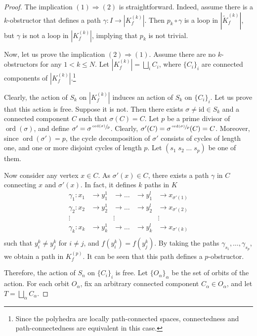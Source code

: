 \documentclass[a4paper,12pt,reqno,oneside]{amsart}
\theoremstyle{plain}
\theoremstyle{definition}
\theoremstyle{plain}
\newcommand{\from}{\colon}
\newcommand{\wt}[1]{\widetilde{#1}}
\newcommand{\id}{\mathrm{id}}
\DeclareMathOperator{\ord}{ord}
\begin{document}
\begin{proof}
  The implication $(1) \Rightarrow (2)$ is straightforward. Indeed, assume there is a
  $k$-obstructor that defines a path $\gamma \from I \to |K^{(k)}_f|$. Then $p_k \circ \gamma$ is a
  loop in $|\wt{K}^{(k)}_f|$, but $\gamma$ is not a loop in $|K^{(k)}_f|$, implying that $p_k$ is not trivial.

  Now, let us prove the implication $(2) \Rightarrow (1)$. Assume there are no $k$-obstructors for
  any $1 < k \leq N$. Let $|K^{(k)}_f| = \bigsqcup_i C_i$, where $\{ C_i \}_i$ are connected
  components of $|K^{(k)}_f|$.\footnote{Since the polyhedra are locally path-connected spaces,
    connectedness and path-connectedness are equivalent in this case.}

  Clearly, the action of $S_k$ on $|K^{(k)}_f|$ induces an action of $S_k$ on $\{ C_i \}_i$. Let us
  prove that this action is free. Suppose it is not. Then there exists $\sigma \neq \id \in S_k$ and
  a connected component $C$ such that $\sigma(C) = C$. Let $p$ be a prime divisor of $\ord(\sigma)$,
  and define $\sigma' = \sigma^{\sfrac{\ord(\sigma)}{p}}$. Clearly,
  $\sigma'(C) = \sigma^{\sfrac{\ord(\sigma)}{p}}(C) = C$. Moreover, since $\ord(\sigma') = p$, the
  cycle decomposition of $\sigma'$ consists of cycles of length one, and one or more disjoint cycles
  of length $p$. Let $(s_1\; s_2\; \dots\; s_p)$ be one of them.

  Now consider any vertex $x \in C$. As $\sigma'(x) \in C$, there exists a path $\gamma$ in $C$
  connecting $x$ and $\sigma'(x)$. In fact, it defines $k$ paths in $K$
  \[
    \begin{aligned}
      \gamma_1 \from x_1 &\to y_1^{1} &\to \dots &\to y_1^{l} &\to x_{\sigma'(1)} \\
      \gamma_2 \from x_2 &\to y_2^{1} &\to \dots &\to y_2^{l} &\to x_{\sigma'(2)} \\
      \vdots             &            & \vdots   &            &\vdots\hspace{1em} \\
      \gamma_k \from x_k &\to y_k^{1} &\to \dots &\to y_k^{l} &\to x_{\sigma'(k)} \\
    \end{aligned}
  \]
  such that $y_i^k \neq y_j^k$ for $i \neq j$, and $f(y_i^k) = f(y_j^k)$. By taking the paths $\gamma_{s_1}, \dots,
  \gamma_{s_p}$, we obtain a path in $K^{(p)}_f$. It can be seen that this path defines a
  $p$-obstructor.

  Therefore, the action of $S_n$ on $\{ C_i \}_i$ is free. Let $\{ O_\alpha \}_\alpha$ be
  the set of orbits of the action. For each orbit $O_\alpha$, fix an arbitrary connected component
  $C_\alpha \in O_\alpha$, and let $T = \bigsqcup_{\alpha} C_\alpha$.


\end{proof}
\end{document}
